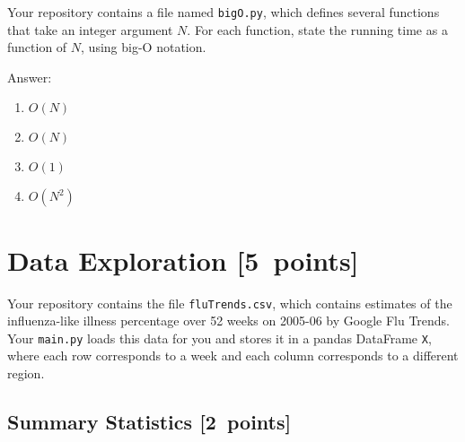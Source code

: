 \documentclass{article}
\newcommand{\blu}[1]{{\textcolor{blu}{#1}}}
\newcommand{\gre}[1]{\textcolor{gre}{#1}}
\newcommand\ans[1]{\par\gre{Answer: #1}}
\let\ask\blu
\newcommand\pts[1]{\textcolor{pointscolour}{[#1~points]}}
\begin{document}
  Your repository contains a file named \texttt{bigO.py}, which defines several functions
  that take an integer argument $N$. For each function, \ask{state the running time as a function of $N$, using big-O notation}.
  \ans{
  \begin{enumerate}
  \item $O(N)$
  \item $O(N)$
  \item $O(1)$
  \item $O(N^2)$
  \end{enumerate}
  }
  \newpage
  \section{Data Exploration \pts{5}}


  Your repository contains the file \texttt{fluTrends.csv}, which contains estimates
  of the influenza-like illness percentage over 52 weeks on 2005-06 by Google Flu Trends.
  Your \texttt{main.py} loads this data for you and stores it in a pandas DataFrame \texttt{X},
  where each row corresponds to a week and each column
  corresponds to a different
  region. 

  \subsection{Summary Statistics \pts{2}}
\end{document}
